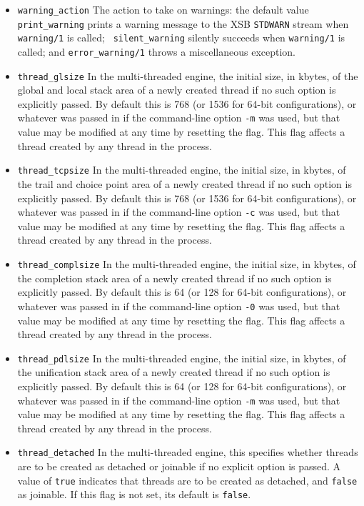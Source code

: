 \begin{description}
\begin{itemize}
\item {\tt warning\_action} The action to take on warnings: the
  default value {\tt print\_warning} prints a warning message to the
  XSB {\tt STDWARN} stream when {\tt warning/1} is called; {\tt
    silent\_warning} silently succeeds when {\tt warning/1} is called;
  and {\tt error\_warning/1} throws a miscellaneous exception.

\item {\tt thread\_glsize} In the multi-threaded engine, the initial
  size, in kbytes, of the global and local stack area of a newly
  created thread if no such option is explicitly passed.  By default
  this is 768 (or 1536 for 64-bit configurations), or whatever was
  passed in if the command-line option {\tt -m} was used, but that
  value may be modified at any time by resetting the flag.  This flag
  affects a thread created by any thread in the process.

\item {\tt thread\_tcpsize} In the multi-threaded engine, the initial
  size, in kbytes, of the trail and choice point area of a newly
  created thread if no such option is explicitly passed.  By default
  this is 768 (or 1536 for 64-bit configurations), or whatever was
  passed in if the command-line option {\tt -c} was used, but that
  value may be modified at any time by resetting the flag.  This flag
  affects a thread created by any thread in the process.

\item {\tt thread\_complsize} In the multi-threaded engine, the
  initial size, in kbytes, of the completion stack area of a newly
  created thread if no such option is explicitly passed.  By default
  this is 64 (or 128 for 64-bit configurations), or whatever was
  passed in if the command-line option {\tt -0} was used, but that
  value may be modified at any time by resetting the flag.  This flag
  affects a thread created by any thread in the process.

\item {\tt thread\_pdlsize} In the multi-threaded engine, the initial
  size, in kbytes, of the unification stack area of a newly created
  thread if no such option is explicitly passed.  By default this is
  64 (or 128 for 64-bit configurations), or whatever was passed in if
  the command-line option {\tt -m} was used, but that value may be
  modified at any time by resetting the flag.  This flag affects a
  thread created by any thread in the process.

\item {\tt thread\_detached} In the multi-threaded engine, this
  specifies whether threads are to be created as detached or joinable
  if no explicit option is passed.  A value of {\tt true} indicates
  that threads are to be created as detached, and {\tt false} as
  joinable.  If this flag is not set, its default is {\tt false}.


\end{itemize}
\end{description}
